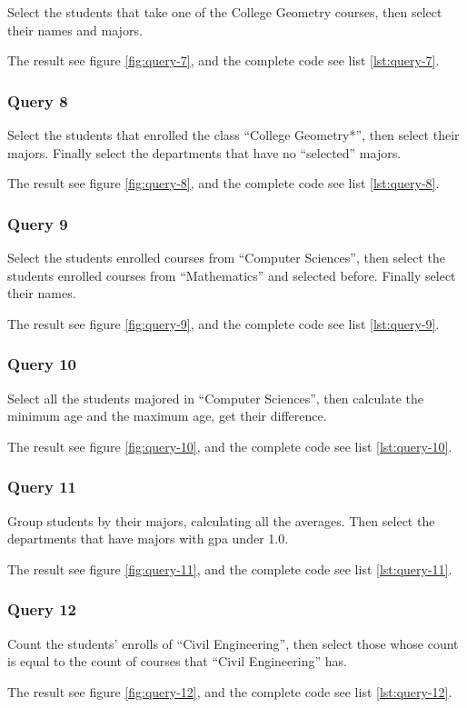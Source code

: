 \documentclass[scheme=plain,12pt]{ctexart}
\newcommand{\result}[1]{

    The result see figure \ref{fig:query-#1}, and the complete code see list \ref{lst:query-#1}.

}
\begin{document}
    Select the students that take one of the College Geometry courses, then select their names and majors.

    \result{7}

    \subsubsection{Query 8}

    Select the students that enrolled the class ``College Geometry*'', then select their majors. Finally select the departments that have no ``selected'' majors.

    \result{8}

    \subsubsection{Query 9}

    Select the students enrolled courses from ``Computer Sciences'', then select the students enrolled courses from ``Mathematics'' and selected before. Finally select their names.

    \result{9}

    \subsubsection{Query 10}

    Select all the students majored in ``Computer Sciences'', then calculate the minimum age and the maximum age, get their difference.

    \result{10}

    \subsubsection{Query 11}

    Group students by their majors, calculating all the averages. Then select the departments that have majors with gpa under 1.0.

    \result{11}

    \subsubsection{Query 12}

    Count the students' enrolls of ``Civil Engineering'', then select those whose count is equal to the count of courses that ``Civil Engineering'' has.

    \result{12}
\end{document}
